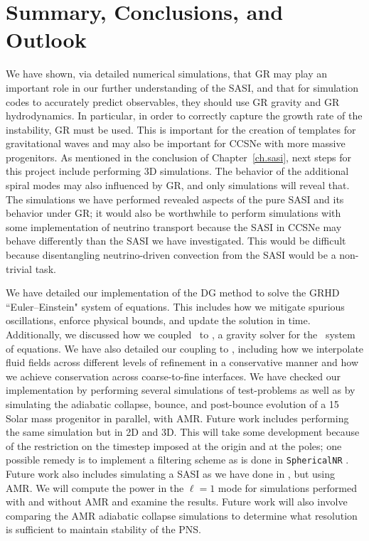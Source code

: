 \chapter{Summary, Conclusions, and Outlook}
\label{ch.con}

We have shown, via detailed numerical simulations, that GR may play an
important role in our further understanding of the SASI, and that for simulation codes to
accurately predict observables, they should use GR gravity and GR hydrodynamics.
In particular, in order to correctly capture the growth rate of the
instability, GR must be used.
This is important for the creation of templates for gravitational waves
and may also be important for CCSNe with more massive progenitors.
As mentioned in the conclusion of Chapter~\ref{ch.sasi},
next steps for this project include performing 3D simulations.
The behavior of the additional spiral modes may also influenced by GR,
and only simulations will reveal that.
The simulations we have performed revealed aspects of the pure SASI and its
behavior under GR;
it would also be worthwhile to perform simulations with some implementation of
neutrino transport because the SASI in CCSNe may behave differently than
the SASI we have investigated.
This would be difficult because disentangling neutrino-driven convection
from the SASI would be a non-trivial task.

We have detailed our implementation of the DG method to solve the GRHD
``Euler--Einstein" system of equations.
This includes how we mitigate spurious oscillations,
enforce physical bounds, and update the solution in time.
Additionally, we discussed how we coupled \thornado\ to \poseidon,
a gravity solver for the \xcfc\ system of equations.
We have also detailed our coupling to \amrex, including how we interpolate
fluid fields across different levels of refinement in a conservative manner
and how we achieve conservation across coarse-to-fine interfaces.
We have checked our implementation by performing several
simulations of test-problems as well as by simulating the adiabatic collapse,
bounce, and
post-bounce evolution of a 15 Solar mass progenitor in parallel, with AMR.
Future work includes performing the same simulation but in 2D and 3D.
This will take some development because of the restriction on the timestep
imposed at the origin and at the poles;
one possible remedy is to implement a filtering scheme as is done in
\texttt{SphericalNR} \citep{jmz2023}.
Future work also includes
simulating a SASI as we have done in \citet{dem2024}, but using AMR.
We will compute the power in the $\ell=1$ mode for simulations performed
with and without AMR and examine the results.
Future work will also involve comparing the AMR adiabatic collapse simulations
to determine what resolution is sufficient to maintain stability of the PNS.

